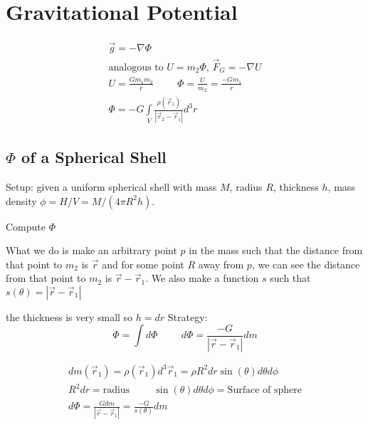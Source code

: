 \documentclass[fleqn]{report}
\newcommand{\hp}{\hspace{1cm}}
\newcommand{\equations} [1] {
\begin{gather*}
#1
\end{gather*}
}
\begin{document}
\section{Gravitational Potential}
\equations{
    \vec g = - \nabla \Phi 
    \\
    \textrm{analogous to $U = m_2 \Phi$, $\vec F_G = - \nabla U$}
    \\
    U = \frac{G m_1 m_2}{r}
    \hp 
    \Phi = \frac{U}{m_2} = \frac{-G m_1}{r}
    \\
    \Phi = -G \int \limits_{V} \frac{\rho (\vec r_1)}{|\vec r_2 - \vec r_1|} d^3 r
}

\subsection{$\Phi$ of a Spherical Shell}
Setup: given a uniform spherical shell with mass $M$, radius $R$, thickness $h$, mass density $\phi = H/V = M / (4 \pi R^2 h)$.

Compute $\Phi$

What we do is make an arbitrary point $p$ in the mass such that the distance from that point to $m_2$ is $\vec r$ and for some point $R$ away from $p$, we can see the distance from that point to $m_2$ is $\vec r - \vec r_1$.
We also make a function $s$ such that $s(\theta) = |\vec r - \vec r_1|$

the thickness is very small so $h = dr$
Strategy:
\[
\Phi = \int d \Phi \hp d \Phi = \frac{-G}{|\vec r - \vec r_1|} dm
\]

\equations{
    dm(\vec r_1) = \rho (\vec r_1) d^3 \vec r_1 = \rho R^2 dr \sin (\theta) d \theta d \phi 
    \\
    R^2 dr = \textrm{radius} \hp \sin (\theta) d \theta d \phi = \textrm{Surface of sphere}
    \\
    d \Phi = \frac{G dm}{|\vec r - \vec r_1|} = \frac{-G}{s(\theta)} dm 
}
\end{document}
